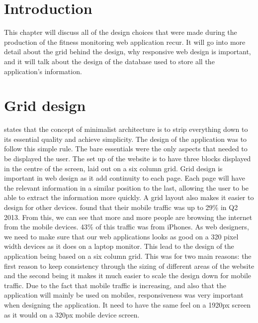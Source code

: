 \section{Introduction}
This chapter will discuss all of the design choices that were made during the production of the fitness monitoring web application recur. It will go into more detail about the grid behind the design, why responsive web design is important, and it will talk about the design of the database used to store all the application's information. \\

\section{Grid design}
\citet{bertoni:2002} states that the concept of minimalist architecture is to strip everything down to its essential quality and achieve simplicity. The design of the application was to follow this simple rule. The bare essentials were the only aspects that needed to be displayed the user. The set up of the website is to have three blocks displayed in the centre of the screen, laid out on a six column grid. Grid design is important in web design as it add continuity to each page. Each page will have the relevant information in a similar position to the last, allowing the user to be able to extract the information more quickly. A grid layout also makes it easier to design for other devices. \citet{walkers:2013} found that their mobile traffic was up to 29\% in Q2 2013. From this, we can see that more and more people are browsing the internet from the mobile devices. 43\% of this traffic was from iPhones. As web designers, we need to make sure that our web applications looks as good on a 320 pixel width devices as it does on a laptop monitor. This lead to the design of the application being based on a six column grid. This was for two main reasons: the first reason to keep consistency through the sizing of different areas of the website and the second being it makes it much easier to scale the design down for mobile traffic. Due to the fact that mobile traffic is increasing, and also that the application will mainly be used on mobiles, responsiveness was very important when designing the application. It need to have the same feel on a 1920px screen as it would on a 320px mobile device screen.\\

